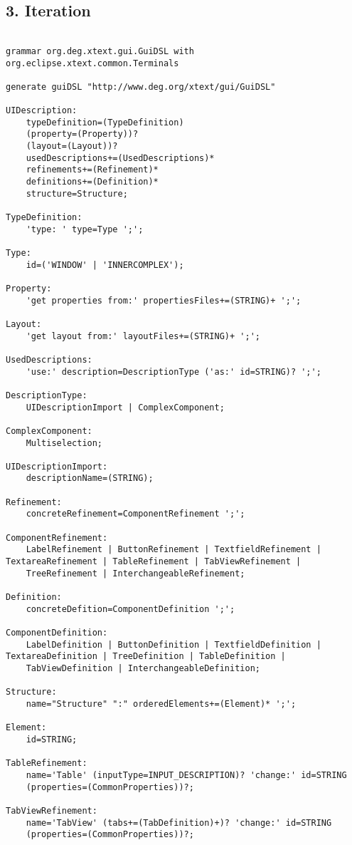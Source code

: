 \subsection*{3. Iteration}
\begin{lstlisting}[caption = Grammatik der 3. Iteration]

grammar org.deg.xtext.gui.GuiDSL with org.eclipse.xtext.common.Terminals

generate guiDSL "http://www.deg.org/xtext/gui/GuiDSL"

UIDescription:
	typeDefinition=(TypeDefinition)
	(property=(Property))?
	(layout=(Layout))?
	usedDescriptions+=(UsedDescriptions)*
	refinements+=(Refinement)*
	definitions+=(Definition)*
	structure=Structure;

TypeDefinition:
	'type: ' type=Type ';';

Type:
	id=('WINDOW' | 'INNERCOMPLEX');

Property:
	'get properties from:' propertiesFiles+=(STRING)+ ';';

Layout:
	'get layout from:' layoutFiles+=(STRING)+ ';';

UsedDescriptions:
	'use:' description=DescriptionType ('as:' id=STRING)? ';';

DescriptionType:
	UIDescriptionImport | ComplexComponent;

ComplexComponent:
	Multiselection;

UIDescriptionImport:
	descriptionName=(STRING);

Refinement:
	concreteRefinement=ComponentRefinement ';';

ComponentRefinement:
	LabelRefinement | ButtonRefinement | TextfieldRefinement | TextareaRefinement | TableRefinement | TabViewRefinement |
	TreeRefinement | InterchangeableRefinement;

Definition:
	concreteDefition=ComponentDefinition ';';

ComponentDefinition:
	LabelDefinition | ButtonDefinition | TextfieldDefinition | TextareaDefinition | TreeDefinition | TableDefinition |
	TabViewDefinition | InterchangeableDefinition;

Structure:
	name="Structure" ":" orderedElements+=(Element)* ';';

Element:
	id=STRING;

TableRefinement:
	name='Table' (inputType=INPUT_DESCRIPTION)? 'change:' id=STRING
	(properties=(CommonProperties))?;

TabViewRefinement:
	name='TabView' (tabs+=(TabDefinition)+)? 'change:' id=STRING
	(properties=(CommonProperties))?;


\end{lstlisting}
